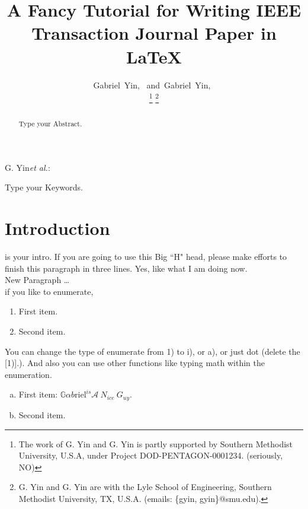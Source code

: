 \documentclass[journal]{IEEEtran}
\begin{document}
\title{A Fancy Tutorial for Writing IEEE Transaction Journal Paper in \LaTeX}

\author{Gabriel~Yin,~ and~Gabriel~Yin,~

\thanks{The work of G. Yin and G. Yin is partly supported by Southern Methodist University, U.S.A,  under Project DOD-PENTAGON-0001234. (seriously, NO)} 
\thanks{G. Yin and G. Yin are with the Lyle School of Engineering, Southern Methodist University, TX, U.S.A. (emails: \{gyin, gyin\}@smu.edu).}}

{G. Yin\MakeLowercase{\textit{et al.}}: }
\maketitle

\begin{abstract}
Type your Abstract.
\end{abstract}

\begin{IEEEkeywords}
Type your Keywords.
\end{IEEEkeywords}

\IEEEpeerreviewmaketitle

\section{Introduction}
 is your intro. If you are going to use this Big ``H" head, please make efforts to finish this paragraph in three lines. Yes, like what I am doing now.\\
\indent New Paragraph \dots\\
\indent if you like to enumerate,
\begin{enumerate}[1)] 
\item First item.
\item Second item.
\end{enumerate}

You can change the type of enumerate from 1) to i), or a), or just dot (delete the [1)].). And also you can use other functions like typing math within the enumeration. 
\begin{enumerate}[a)] 
\item First item: $\mathbb{G}\alpha b\text{riel}^{is} \mathcal{A} \ N_{ice} \ G_{uy}$.
\item Second item.
\end{enumerate}
\end{document}
